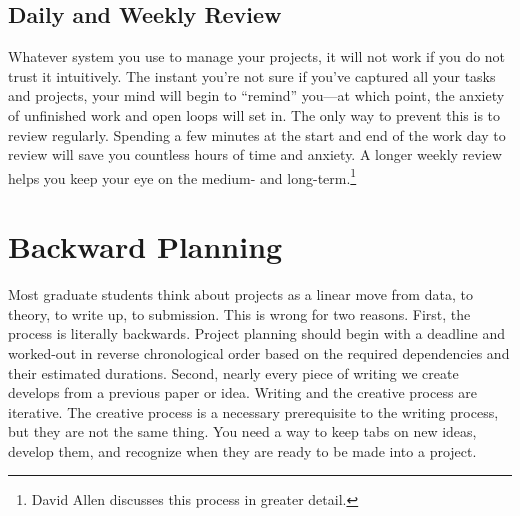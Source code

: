 \documentclass{tufte-handout}
\begin{document}
\subsection{Daily and Weekly Review}
\label{sec:review}

Whatever system you use to manage your projects, it will not work if
you do not trust it intuitively. The instant you're not sure if you've
captured all your tasks and projects, your mind will begin to
``remind'' you---at which point, the anxiety of unfinished work and
open loops will set in. The only way to prevent this is to review
regularly. Spending a few minutes at the start and end of the work day
to review will save you countless hours of time and anxiety. A longer
weekly review helps you keep your eye on the medium- and
long-term.\footnote{David Allen discusses this process in greater
  detail.}



\section{Backward Planning} %
\label{sec:backward_planning}

Most graduate students think about projects as a linear move from data, to theory, to write up, to submission. This is wrong for two reasons. First, the process is literally backwards. Project planning should begin with a deadline and worked-out in reverse chronological order based on the required dependencies and their estimated durations. Second, nearly every piece of writing we create develops from a previous paper or idea. Writing and the creative process are iterative. The creative process is a necessary prerequisite to the writing process, but they are not the same thing. You need a way to keep tabs on new ideas, develop them, and recognize when they are ready to be made into a project.



\end{document}
